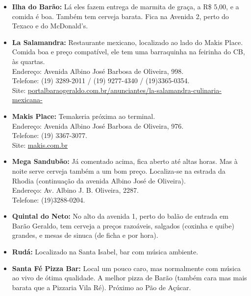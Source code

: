 \begin{itemize}
\item   \textbf{Ilha do Barão:} Lá eles fazem entrega de marmita de graça, a
        R\$ 5,00, e a comida é boa. Também tem cerveja barata. Fica na Avenida
        2, perto do Texaco e do McDonald's.

\item   \textbf{La Salamandra:} Restaurante mexicano, localizado ao lado do
        Makis Place. Comida boa e preço compatível, ele tem uma barraquinha na
        feirinha do CB, às quartas.
        \\Endereço: Avenida Albino José Barbosa de Oliveira, 998.
        \\Telefone: (19) 3289-2011 / (19) 9277-4340 / (19)3365-0354.
        \\Site: \url{portalbaraogeraldo.com.br/anunciantes/la-salamandra-culinaria-mexicana-}

\item   \textbf{Makis Place:} Temakeria próxima ao terminal.
        \\Endereço: Avenida Albino José Barbosa de Oliveira, 976.
        \\Telefone: (19) 3367-3077.
        \\Site: \url{makis.com.br}

\item   \textbf{Mega Sandubão:} Já comentado acima, fica aberto até altas horas.
        Mas à noite serve cerveja também a um bom preço. Localiza-se na estrada
        da Rhodia (continuação da avenida Albino José de Oliveira).
        \\Endereço: Av. Albino J. B. Oliveira, 2287.
        \\Telefone: (19)3288-0204.

\item   \textbf{Quintal do Neto:} No alto da avenida 1, perto do balão de
        entrada em Barão Geraldo, tem cerveja a preços razoáveis, salgados
        (coxinha e quibe) grandes, e mesas de sinuca (de ficha e por hora).

\item   \textbf{Rudá:} Localizado na Santa Isabel, bar com música ambiente.

\item   \textbf{Santa Fé Pizza Bar:} Local um pouco caro, mas normalmente com
        música ao vivo de ótima qualidade. A melhor pizza de Barão (também cara
        mas mais barata que a Pizzaria Vila Ré). Próximo ao Pão de Açúcar.


\end{itemize}
